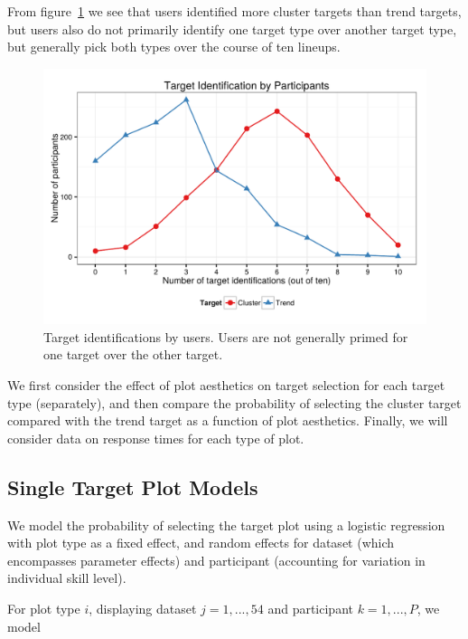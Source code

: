 \documentclass[11pt]{isuthesis}\usepackage[]{graphicx}\usepackage[]{color}
\newenvironment{knitrout}{}{} %
\begin{document}
From figure~\ref{fig:targets} we see that users identified more cluster targets than trend targets, but users also do not primarily identify one target type over another target type, but generally pick both types over the course of ten lineups.

\begin{figure}[ht]
\centering
\begin{knitrout}
\color{fgcolor}

{\centering \includegraphics[width=0.6\linewidth]{Figure/FeatureHierarchy/fig-targets-1} 

}



\end{knitrout}
\caption[Target identifications by users]{\label{fig:targets}Target identifications by users. Users are not generally primed for one target over the other target.}
\end{figure}

We  first consider the effect of plot aesthetics on target selection for each target type (separately), and then compare the probability of selecting the cluster target compared with the trend target as a function of plot aesthetics. Finally, we will consider data on response times for each type of plot.

\subsection{Single Target Plot Models}

We  model the probability of selecting the target plot using a logistic regression with plot type as a fixed effect, and random effects for dataset (which encompasses parameter effects) and participant (accounting for variation in individual skill level). 

For plot type $i$, displaying dataset $j=1, ..., 54$ and participant $k=1, ..., P$, we model
\end{document}
